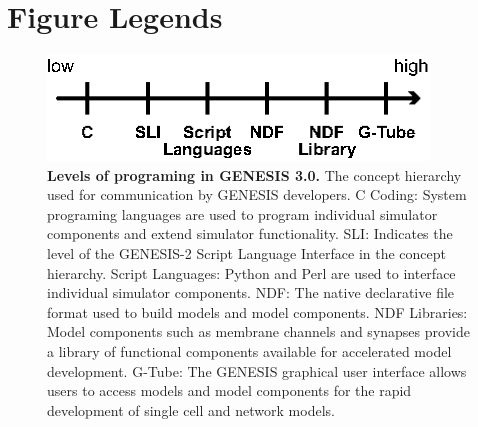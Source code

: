 \documentclass[10pt]{article}
\begin{document}


\newpage

\section*{Figure Legends}

\begin{figure}[ht]
\begin{center}
\includegraphics[width=4in]{figures/g3-interfacing.eps}
\end{center}
\caption{
{\bf Levels of programing in GENESIS 3.0.} The concept hierarchy used for communication by GENESIS developers. C Coding: System programing languages are used to program individual simulator components and extend simulator functionality. SLI: Indicates the level of the GENESIS-2 Script Language Interface in the concept hierarchy. Script Languages: Python and Perl are used to interface individual simulator components. NDF: The native declarative file format used to build models and model components. NDF Libraries: Model components such as membrane channels and synapses provide a library of functional components available for accelerated model development. G-Tube: The GENESIS graphical user interface allows users to access models and model components for the rapid development of single cell and network models.
}
\label{fig:g3-interfacing}
\end{figure}

\clearpage
\end{document}
